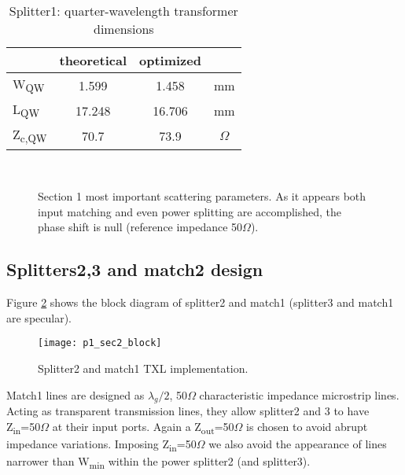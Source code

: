 \begin{table} [H]
	\label{tab:p1_sec1DimQW}
	\caption{Splitter1: quarter-wavelength transformer dimensions}
	\centering	
	\begin{tabular}{lccc} 
		\toprule
		& theoretical & optimized&\\
		\midrule 
		W\textsubscript{QW} 	&	1.599		&	1.458	& mm		\\
		L\textsubscript{QW}	&	17.248		& 	16.706		& mm	\\ 
		Z\textsubscript{c,QW}& 	70.7 &73.9	&$\Omega$ \\
		\bottomrule
	\end{tabular}	
\end{table}
\begin{figure}[p] 
	\centering
	\quad
	\\
	\caption{Section 1 most important scattering parameters. As it appears both input matching and even power splitting are accomplished, the phase shift is null (reference impedance 50$\Omega$).}
	\label{fig:p1_sec1Scatt}
\end{figure}
\newpage

\subsection{Splitters2,3 and match2 design}

Figure \ref{fig:p1_sec2_block} shows the block diagram of splitter2 and match1 (splitter3  and match1 are specular).
\begin{figure}[H] 
	\centering
	\texttt{[image: p1\_sec2\_block]}
	\caption{Splitter2 and match1 TXL implementation. }
	\label{fig:p1_sec2_block}
\end{figure}
Match1 lines are designed as $\lambda_{g}/2$, 50$\Omega$ characteristic impedance microstrip lines. Acting as transparent transmission lines, they allow splitter2 and 3 to have Z\textsubscript{in}=50$\Omega$ at their input ports. Again a Z\textsubscript{out}=50$\Omega$ is chosen to avoid abrupt impedance variations. Imposing Z\textsubscript{in}=50$\Omega$ we also avoid the appearance of lines narrower than W\textsubscript{min} within the power splitter2 (and splitter3).


